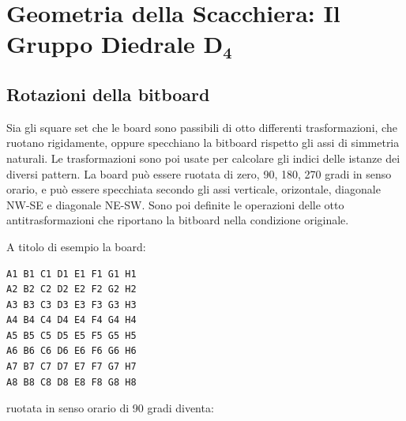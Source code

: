 %
%
%
%
%
%
%


\section{Geometria della Scacchiera: Il Gruppo Diedrale \texorpdfstring{$\bm{D_4}$}{D4}}

\subsection{Rotazioni della bitboard}

Sia gli square set che le board sono passibili di otto differenti trasformazioni, che ruotano rigidamente, oppure specchiano la bitboard rispetto gli assi di simmetria
naturali. Le trasformazioni sono poi usate per calcolare gli indici delle istanze dei diversi pattern.
La board può essere ruotata di zero, 90, 180, 270 gradi in senso orario, e può essere specchiata secondo gli assi verticale, orizontale, diagonale NW-SE e diagonale NE-SW.
Sono poi definite le operazioni delle otto antitrasformazioni che riportano la bitboard nella condizione originale.

A titolo di esempio la board:

{\tiny
\begin{verbatim}
A1 B1 C1 D1 E1 F1 G1 H1
A2 B2 C2 D2 E2 F2 G2 H2
A3 B3 C3 D3 E3 F3 G3 H3
A4 B4 C4 D4 E4 F4 G4 H4
A5 B5 C5 D5 E5 F5 G5 H5
A6 B6 C6 D6 E6 F6 G6 H6
A7 B7 C7 D7 E7 F7 G7 H7
A8 B8 C8 D8 E8 F8 G8 H8
\end{verbatim}
}

ruotata in senso orario di 90 gradi diventa:

